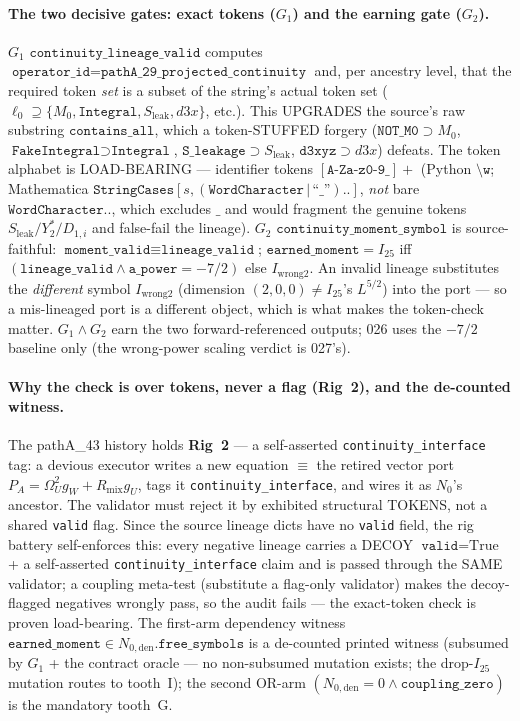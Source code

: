 \paragraph{The two decisive gates: exact tokens (\(G_1\)) and the earning gate (\(G_2\)).}
\(G_1\) \(\texttt{continuity\_lineage\_valid}\) computes \(\texttt{operator\_id}=\texttt{pathA\_29\_projected\_continuity}\)
and, per ancestry level, that the required token \emph{set} is a subset of the string's actual token set
(\(\ell_0\supseteq\{M_0,\texttt{Integral},S_{\mathrm{leak}},d3x\}\), etc.). This UPGRADES the source's raw
substring \(\texttt{contains\_all}\), which a token-STUFFED forgery
(\(\texttt{NOT\_M0}\supset M_0\), \(\texttt{FakeIntegral}\supset\texttt{Integral}\),
\(\texttt{S\_leakage}\supset S_{\mathrm{leak}}\), \(\texttt{d3xyz}\supset d3x\)) defeats. The token alphabet is
LOAD-BEARING --- identifier tokens \([\texttt{A-Za-z0-9\_}]+\) (Python \(\texttt{\textbackslash w}\);
Mathematica \(\texttt{StringCases}[s,(\texttt{WordCharacter}\,|\,\text{``\_''})..]\), \emph{not} bare
\(\texttt{WordCharacter}..\), which excludes \(\_\) and would fragment the genuine tokens
\(S_{\mathrm{leak}}/Y_2^{*}/D_{1,i}\) and false-fail the lineage). \(G_2\) \(\texttt{continuity\_moment\_symbol}\)
is source-faithful: \(\texttt{moment\_valid}\equiv\texttt{lineage\_valid}\);
\(\texttt{earned\_moment}=I_{25}\) iff \((\texttt{lineage\_valid}\wedge\texttt{a\_power}=-7/2)\) else
\(I_{\mathrm{wrong2}}\). An invalid lineage substitutes the \emph{different} symbol \(I_{\mathrm{wrong2}}\)
(dimension \((2,0,0)\neq I_{25}\)'s \(L^{5/2}\)) into the port --- so a mis-lineaged port is a different
object, which is what makes the token-check matter. \(G_1\wedge G_2\) earn the two forward-referenced outputs;
026 uses the \(-7/2\) baseline only (the wrong-power scaling verdict is 027's).

\paragraph{Why the check is over tokens, never a flag (Rig~2), and the de-counted witness.}
The pathA\_43 history holds \textbf{Rig~2} --- a self-asserted \texttt{continuity\_interface} tag: a devious
executor writes a new equation \(\equiv\) the retired vector port \(P_A=\Omega_U^2 g_W+R_{\mathrm{mix}}g_U\),
tags it \texttt{continuity\_interface}, and wires it as \(N_0\)'s ancestor. The validator must reject it by
exhibited structural TOKENS, not a shared \texttt{valid} flag. Since the source lineage dicts have no
\texttt{valid} field, the rig battery self-enforces this: every negative lineage carries a DECOY
\(\texttt{valid}=\text{True}\) + a self-asserted \texttt{continuity\_interface} claim and is passed through the
SAME validator; a coupling meta-test (substitute a flag-only validator) makes the decoy-flagged negatives
wrongly pass, so the audit fails --- the exact-token check is proven load-bearing. The first-arm dependency
witness \(\texttt{earned\_moment}\in N_{0,\mathrm{den}}.\texttt{free\_symbols}\) is a de-counted printed
witness (subsumed by \(G_1\) + the contract oracle --- no non-subsumed mutation exists; the drop-\(I_{25}\)
mutation routes to tooth~I); the second OR-arm \((N_{0,\mathrm{den}}=0\wedge\texttt{coupling\_zero})\) is the
mandatory tooth~G.

